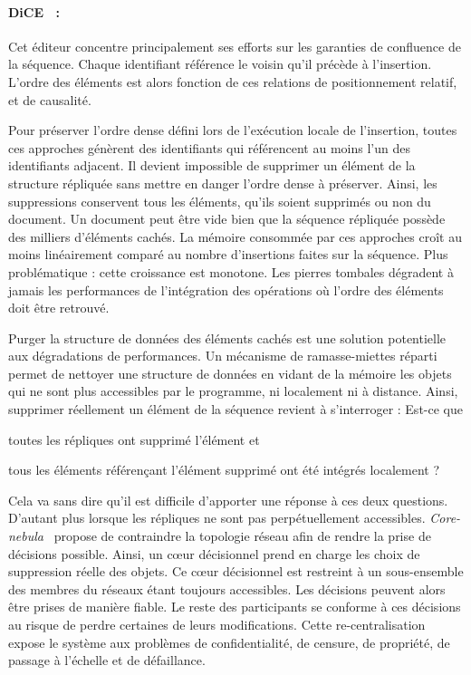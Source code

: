 \paragraph{DiCE~\cite{conway2014language} :} Cet éditeur concentre
principalement ses efforts sur les garanties de confluence de la
séquence. Chaque identifiant référence le voisin qu'il précède à
l'insertion. L'ordre des éléments est alors fonction de ces relations de
positionnement relatif, et de causalité.

Pour préserver l'ordre dense défini lors de l'exécution locale de l'insertion,
toutes ces approches génèrent des identifiants qui référencent au moins l'un
des identifiants adjacent. Il devient impossible de supprimer un élément de la
structure répliquée sans mettre en danger l'ordre dense à préserver. Ainsi, les
suppressions conservent tous les éléments, qu'ils soient supprimés ou non du
document.  Un document peut être vide bien que la séquence répliquée possède des
milliers d'éléments cachés. La mémoire consommée par ces approches croît au
moins linéairement comparé au nombre d'insertions faites sur la séquence. Plus
problématique : cette croissance est monotone.  Les pierres tombales dégradent à
jamais les performances de l'intégration des opérations où l'ordre des éléments
doit être retrouvé.

Purger la structure de données des éléments cachés est une solution potentielle
aux dégradations de performances. Un mécanisme de ramasse-miettes
réparti~\cite{abdullahi1998garbage} permet de nettoyer une structure de données
en vidant de la mémoire les objets qui ne sont plus accessibles par le
programme, ni localement ni à distance. Ainsi, supprimer réellement un élément
de la séquence revient à s'interroger : \og Est-ce que
\begin{inparaenum}[(i)]
\item toutes les répliques ont supprimé l'élément et
\item tous les éléments référençant l'élément supprimé ont été intégrés
  localement ?
\end{inparaenum}\fg Cela va sans dire qu'il est difficile d'apporter une réponse
à ces deux questions. D'autant plus lorsque les répliques ne sont pas
perpétuellement accessibles. \emph{Core-nebula}~\cite{letia2009crdts} propose de
contraindre la topologie réseau afin de rendre la prise de décisions
possible. Ainsi, un cœur décisionnel prend en charge les choix de suppression
réelle des objets.  Ce cœur décisionnel est restreint à un sous-ensemble des
membres du réseaux étant toujours accessibles. Les décisions peuvent alors être
prises de manière fiable. Le reste des participants se conforme à ces décisions
au risque de perdre certaines de leurs modifications. Cette re-centralisation
expose le système aux problèmes de confidentialité, de censure, de propriété, de
passage à l'échelle et de défaillance.
 
